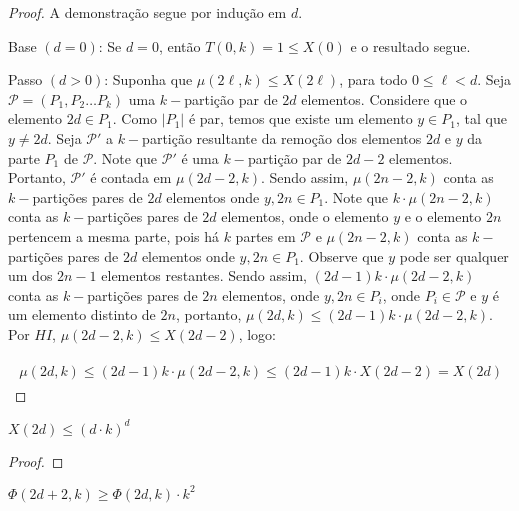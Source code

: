 \documentclass[12pt]{article}
\begin{document}
  \begin{proof} 
  	A demonstração segue por indução em $d$. \newl
  	
  	Base $(d = 0)$: Se $d=0$, então $T(0, k) = 1 \leq X(0)$ e o resultado segue. \newl
  	
  	Passo $(d > 0)$: Suponha que $\mu(2\ell, k) \leq X(2\ell)$, para todo $0 \leq \ell < d$. Seja $\mathcal{P}=(P_1, P_2 \ldots P_k)$ uma $k-$partição par de $2d$ elementos. Considere que o elemento $2d \in P_1$. Como $|P_1|$ é par, temos que existe um elemento $y \in P_1$, tal que $y \neq 2d$. Seja $\mathcal{P'}$ a $k-$partição resultante da remoção dos elementos $2d$ e $y$ da parte $P_1$ de $\mathcal{P}$. Note que $\mathcal{P'}$ é uma $k-$partição par de $2d - 2$ elementos. Portanto, $\mathcal{P'}$ é contada em $\mu(2d - 2, k)$. Sendo assim, $\mu(2n - 2, k)$ conta as $k-$partições pares de $2d$ elementos onde $y, 2n \in P_1$. Note que $k \cdot \mu(2n - 2, k)$ conta as $k-$partições pares de $2d$ elementos, onde o elemento $y$ e o elemento $2n$ pertencem a mesma parte, pois há $k$ partes em $\mathcal{P}$ e $\mu(2n - 2, k)$ conta as $k-$partições pares de $2d$ elementos onde $y, 2n \in P_1$. Observe que $y$ pode ser qualquer um dos $2n - 1$ elementos restantes. Sendo assim, $(2d - 1)k \cdot \mu(2d - 2, k)$ conta as $k-$partições pares de $2n$ elementos, onde $y, 2n \in P_i$, onde $P_i \in \mathcal{P}$ e $y$ é um elemento distinto de $2n$, portanto, $\mu(2d, k) \leq (2d - 1)k \cdot \mu(2d - 2, k)$. Por $HI$, $\mu(2d - 2, k) \leq X(2d - 2)$, logo:
  	
  	\begin{align}
  		\begin{split}
  			\mu(2d, k) \leq (2d - 1)k \cdot \mu(2d - 2, k) \leq (2d - 1)k \cdot X(2d - 2) = X(2d)
  		\end{split} 
  	\end{align} 
  	
  \end{proof} \enlargethispage{-3\baselineskip}

  \begin{lema}  
  	\label{lema7} 
  	$ X(2d) \leq (d\cdot k)^d$
  \end{lema}
  
  \begin{proof}
  	
  \end{proof} \newl
  
  \begin{lema} 
  	\label{lema8} 
  	$\Phi(2d+2, k) \geq \Phi(2d, k) \cdot k^{2}$
  \end{lema}
  
\end{document}
